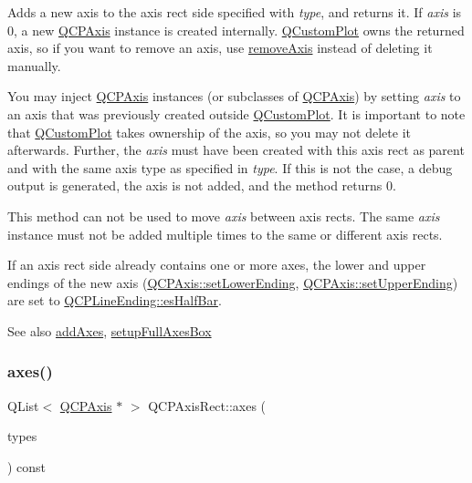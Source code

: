 Adds a new axis to the axis rect side specified with {\itshape type}, and returns it. If {\itshape axis} is 0, a new \hyperlink{classQCPAxis}{Q\+C\+P\+Axis} instance is created internally. \hyperlink{classQCustomPlot}{Q\+Custom\+Plot} owns the returned axis, so if you want to remove an axis, use \hyperlink{classQCPAxisRect_a03c39cd9704f0d36fb6cf980cdddcbaa}{remove\+Axis} instead of deleting it manually.

You may inject \hyperlink{classQCPAxis}{Q\+C\+P\+Axis} instances (or subclasses of \hyperlink{classQCPAxis}{Q\+C\+P\+Axis}) by setting {\itshape axis} to an axis that was previously created outside \hyperlink{classQCustomPlot}{Q\+Custom\+Plot}. It is important to note that \hyperlink{classQCustomPlot}{Q\+Custom\+Plot} takes ownership of the axis, so you may not delete it afterwards. Further, the {\itshape axis} must have been created with this axis rect as parent and with the same axis type as specified in {\itshape type}. If this is not the case, a debug output is generated, the axis is not added, and the method returns 0.

This method can not be used to move {\itshape axis} between axis rects. The same {\itshape axis} instance must not be added multiple times to the same or different axis rects.

If an axis rect side already contains one or more axes, the lower and upper endings of the new axis (\hyperlink{classQCPAxis_a08af1c72db9ae4dc8cb8a973d44405ab}{Q\+C\+P\+Axis\+::set\+Lower\+Ending}, \hyperlink{classQCPAxis_a69119b892fc306f651763596685aa377}{Q\+C\+P\+Axis\+::set\+Upper\+Ending}) are set to \hyperlink{classQCPLineEnding_a5ef16e6876b4b74959c7261d8d4c2cd5a126c390f0c359fcd8df1fc5e38d26d5b}{Q\+C\+P\+Line\+Ending\+::es\+Half\+Bar}.

\begin{DoxySeeAlso}{See also}
\hyperlink{classQCPAxisRect_a792e1f3d9cb1591fca135bb0de9b81fc}{add\+Axes}, \hyperlink{classQCPAxisRect_a5fa906175447b14206954f77fc7f1ef4}{setup\+Full\+Axes\+Box} 
\end{DoxySeeAlso}
\mbox{\label{classQCPAxisRect_a8db4722cb93e9c4a6f0d91150c200867}} 
\subsubsection{\texorpdfstring{axes()}{axes()}\hspace{0.1cm}{\footnotesize\ttfamily [1/2]}}
{\footnotesize\ttfamily Q\+List$<$ \hyperlink{classQCPAxis}{Q\+C\+P\+Axis} $\ast$ $>$ Q\+C\+P\+Axis\+Rect\+::axes (\begin{DoxyParamCaption}\item[{Q\+C\+P\+Axis\+::\+Axis\+Types}]{types }\end{DoxyParamCaption}) const}

